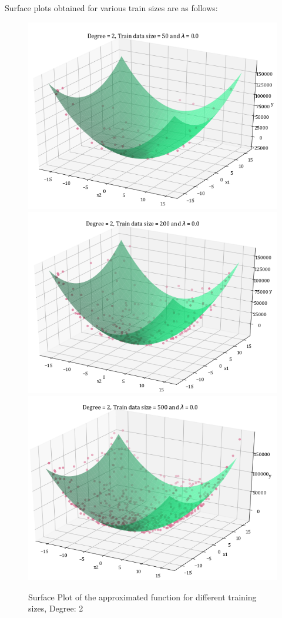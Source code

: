 \documentclass[12pt,a4paper]{article}
\begin{document}
Surface plots obtained for various train sizes are as follows: 
\begin{figure}[H]
    \centering
    \includegraphics[scale=0.6]{images/D=2,T=50,l=0.0.png}
    \hspace{2em}
    \includegraphics[scale=0.6]{images/D=2,T=200,l=0.0.png}
    \includegraphics[scale=0.6]{images/D=2,T=500,l=0.0.png}
    \caption{Surface Plot of the approximated function for different training sizes, Degree: 2}
    \label{fig:sp_d2}
\end{figure}
\end{document}
